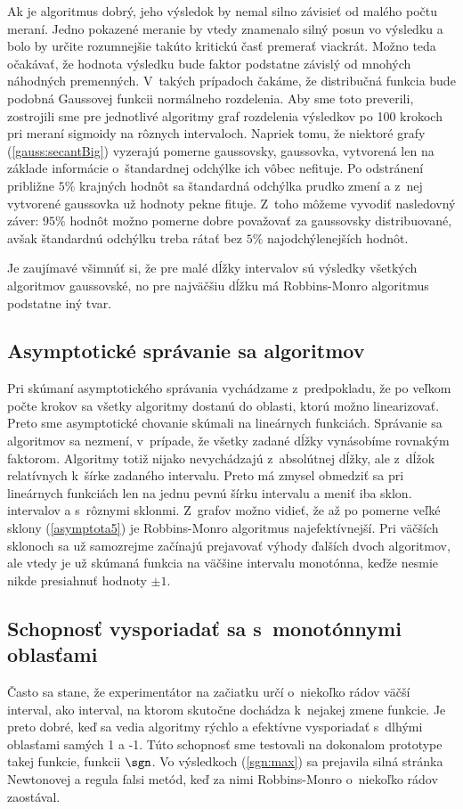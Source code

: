 Ak je algoritmus dobrý, jeho výsledok by nemal silno závisieť od malého počtu
meraní. Jedno pokazené meranie by vtedy znamenalo silný posun vo výsledku a bolo
by určite rozumnejšie takúto kritickú časť premerať viackrát. Možno teda
očakávať, že hodnota výsledku bude faktor podstatne závislý od mnohých náhodných
premenných. V~takých prípadoch čakáme, že distribučná funkcia bude podobná
Gaussovej funkcii normálneho rozdelenia. Aby sme toto preverili, zostrojili sme
pre jednotlivé algoritmy graf rozdelenia výsledkov po 100 krokoch pri meraní
sigmoidy na rôznych intervaloch. Napriek tomu, že niektoré grafy
(\ref{gauss:secantBig})
vyzerajú pomerne gaussovsky, gaussovka, vytvorená len na základe informácie
o~štandardnej odchýlke ich vôbec nefituje. Po odstránení približne $5\unit{\%}$
krajných hodnôt sa štandardná odchýlka prudko zmení a z~nej vytvorené gaussovka
už hodnoty pekne fituje. Z~toho môžeme vyvodiť nasledovný záver: $95\unit{\%}$
hodnôt možno pomerne dobre považovať za gaussovsky distribuované, avšak
štandardnú odchýlku treba rátať bez $5\unit{\%}$ najodchýlenejších hodnôt.

Je zaujímavé všimnúť si, že pre malé dĺžky intervalov sú výsledky všetkých
algoritmov gaussovské, no pre najväčšiu dĺžku má Robbins-Monro algoritmus
podstatne iný tvar.

\subsection{Asymptotické správanie sa algoritmov}
Pri skúmaní asymptotického správania vychádzame z~predpokladu, že po veľkom počte
krokov sa všetky algoritmy dostanú do oblasti, ktorú možno linearizovať. Preto
sme asymptotické chovanie skúmali na lineárnych funkciách. Správanie sa
algoritmov sa nezmení, v~prípade, že všetky zadané dĺžky vynásobíme rovnakým
faktorom. Algoritmy totiž nijako nevychádzajú z~absolútnej dĺžky, ale z~dĺžok
relatívnych k~šírke zadaného intervalu. Preto má zmysel obmedziť sa pri
lineárnych funkciách len na jednu pevnú šírku intervalu a meniť iba sklon.
intervalov a s~rôznymi sklonmi. Z~grafov možno vidieť, že až po pomerne veľké
sklony (\ref{asymptota5}) je Robbins-Monro algoritmus najefektívnejší. Pri
väčších sklonoch sa už samozrejme začínajú prejavovať výhody ďalších dvoch
algoritmov, ale vtedy je už skúmaná funkcia na väčšine intervalu monotónna,
keďže nesmie nikde presiahnuť hodnoty $\pm 1$.

\subsection{Schopnosť vysporiadať sa s~monotónnymi oblasťami}
Často sa stane, že experimentátor na začiatku určí o~niekoľko rádov väčší
interval, ako interval, na ktorom skutočne dochádza k~nejakej zmene funkcie. Je
preto dobré, keď sa vedia algoritmy rýchlo a efektívne vysporiadať s~dlhými
oblasťami samých 1 a -1. Túto schopnosť sme testovali na dokonalom prototype
takej funkcie, funkcii $\sgn$. Vo výsledkoch (\ref{sgn:max}) sa prejavila silná
stránka Newtonovej a regula falsi metód, keď za nimi Robbins-Monro o~niekoľko
rádov zaostával.

